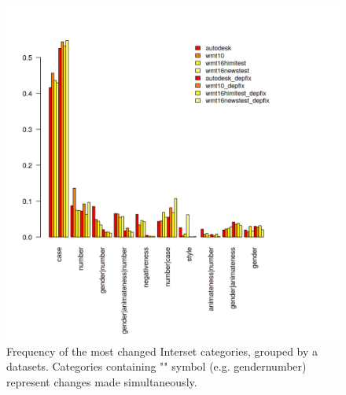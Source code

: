 \begin{figure}
\centering
  \includegraphics[scale=0.7]{iset}
  \caption{
    Frequency of the most changed Interset categories, grouped by a datasets. Categories containing
    "\textbar" symbol (e.g. gender\textbar{}number) represent changes made simultaneously.
}
  \label{iset-barplot}
\end{figure}

